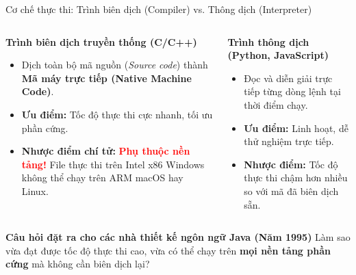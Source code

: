 \documentclass[aspectratio=169, 10pt]{beamer}
\begin{document}
\begin{frame}{Cơ chế thực thi: Trình biên dịch (Compiler) vs. Thông dịch (Interpreter)}
  \begin{columns}[t]
    \begin{block}{\textbf{Trình biên dịch truyền thống (C/C++)}}
      \begin{itemize}
        \item Dịch toàn bộ mã nguồn (\textit{Source code}) thành \textbf{Mã máy trực tiếp (Native Machine Code)}.
        \item \textbf{Ưu điểm:} Tốc độ thực thi cực nhanh, tối ưu phần cứng.
        \item \textbf{Nhược điểm chí tử:} \textcolor{red}{\textbf{Phụ thuộc nền tảng!}} File thực thi trên Intel x86 Windows không thể chạy trên ARM macOS hay Linux.
      \end{itemize}
    \end{block}

    \begin{block}{\textbf{Trình thông dịch (Python, JavaScript)}}
      \begin{itemize}
        \item Đọc và diễn giải trực tiếp từng dòng lệnh tại thời điểm chạy.
        \item \textbf{Ưu điểm:} Linh hoạt, dễ thử nghiệm trực tiếp.
        \item \textbf{Nhược điểm:} Tốc độ thực thi chậm hơn nhiều so với mã đã biên dịch sẵn.
      \end{itemize}
    \end{block}
  \end{columns}

  \vspace{3mm}
  \begin{alertblock}{\textbf{Câu hỏi đặt ra cho các nhà thiết kế ngôn ngữ Java (Năm 1995)}}
    Làm sao vừa đạt được tốc độ thực thi cao, vừa có thể chạy trên \textbf{mọi nền tảng phần cứng} mà không cần biên dịch lại?
  \end{alertblock}
\end{frame}
\end{document}
